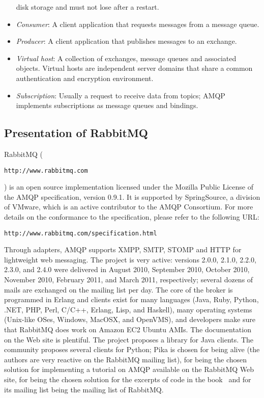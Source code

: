 \begin{itemize}
  disk storage and must not lose after a restart.
\item \textit{Consumer}: A client application that requests messages
  from a message queue.
\item \textit{Producer}: A client application that publishes messages
  to an exchange.
\item \textit{Virtual host}: A collection of exchanges, message queues
  and associated objects. Virtual hosts are independent server domains
  that share a common authentication and encryption environment.
\item \textit{Subscription}: Usually a request to receive data from
  topics; AMQP implements subscriptions as message queues and
  bindings.
\end{itemize}

\subsection{Presentation of \textsf{RabbitMQ}}
\label{SS_presentation_rabbitmq}

\textsf{RabbitMQ}
(\begin{small}\texttt{http://www.rabbitmq.com}\end{small}) is an open
source implementation licensed under the Mozilla Public License of the
AMQP specification, version 0.9.1. It is supported by SpringSource, a
division of VMware, which is an active contributor to the AMQP
Consortium. For more details on the conformance to the specification,
please refer to the following
URL: \begin{small}\texttt{http://www.rabbitmq.com/specification.html}\end{small}
Through adapters, AMQP supports XMPP, SMTP, STOMP and HTTP for
lightweight web messaging. The project is very active: versions 2.0.0,
2.1.0, 2.2.0, 2.3.0, and 2.4.0 were delivered in August 2010,
September 2010, October 2010, November 2010, February 2011, and March
2011, respectively; several dozens of mails are exchanged on the
mailing list per day. The core of the broker is programmed in Erlang
and clients exist for many languages (Java, Ruby, Python, .NET, PHP,
Perl, C/C++, Erlang, Lisp, and Haskell), many operating systems
(Unix-like OSes, Windows, MacOSX, and OpenVMS), and developers make
sure that \textsf{RabbitMQ} does work on Amazon EC2 Ubuntu AMIs. The
documentation on the Web site is plentiful. The project proposes a
library for Java clients. The community proposes several clients for Python; Pika is
chosen for being alive (the authors are very reactive on the
\textsf{RabbitMQ} mailing list), for being the chosen solution for
implementing a tutorial on AMQP available on the \textsf{RabbitMQ} Web
site, for being the chosen solution for the excerpts of code in the
book~\cite{rabbitmq} and for its mailing list being the mailing list
of \textsf{RabbitMQ}.

